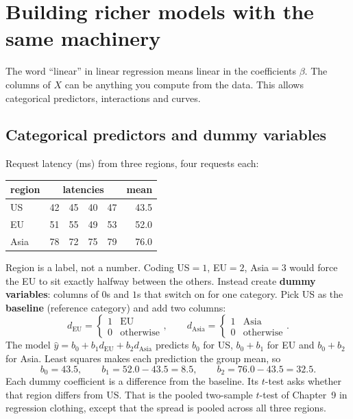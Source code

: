 \section{Building richer models with the same machinery}
\label{sec:mlr-features}

The word ``linear'' in linear regression means linear in the coefficients $\beta$. The
columns of $X$ can be anything you compute from the data. This allows categorical
predictors, interactions and curves.

\subsection{Categorical predictors and dummy variables}

Request latency (ms) from three regions, four requests each:

\begin{center}
\begin{tabular}{lrrrrr}
\toprule
region & \multicolumn{4}{c}{latencies} & mean \\
\midrule
US & 42 & 45 & 40 & 47 & 43.5\\
EU & 51 & 55 & 49 & 53 & 52.0\\
Asia & 78 & 72 & 75 & 79 & 76.0\\
\bottomrule
\end{tabular}
\end{center}

Region is a label, not a number. Coding US$=1$, EU$=2$, Asia$=3$ would force the EU to sit
exactly halfway between the others. Instead create \textbf{dummy variables}: columns of
$0$s and $1$s that switch on for one category. Pick US as the \textbf{baseline}
(reference category) and add two columns:
\[
  d_{\text{EU}} = \begin{cases}1 & \text{EU}\\0&\text{otherwise}\end{cases},\qquad
  d_{\text{Asia}} = \begin{cases}1 & \text{Asia}\\0&\text{otherwise}\end{cases}.
\]
The model $\hat y = b_0 + b_1 d_{\text{EU}} + b_2 d_{\text{Asia}}$ predicts $b_0$ for
US, $b_0+b_1$ for EU and $b_0 + b_2$ for Asia. Least squares makes each prediction the
group mean, so
\[
  b_0 = 43.5,\qquad b_1 = 52.0 - 43.5 = 8.5,\qquad b_2 = 76.0 - 43.5 = 32.5 .
\]
Each dummy coefficient is a difference from the baseline. Its $t$-test asks whether that
region differs from US. That is the pooled two-sample $t$-test of Chapter~9 in regression
clothing, except that the spread is pooled across all three regions.

